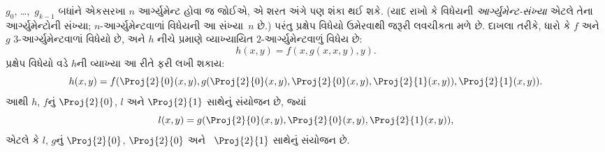 \documentclass[../../../include/open-logic-section]{subfiles}
\begin{document}
$g_0$, \dots,~$g_{k-1}$ બધાંને એકસરખા $n$ આર્ગ્યુમેન્ટ હોવા
જ જોઈએ, એ શરત અંગે પણ શંકા થઈ શકે. (યાદ રાખો કે વિધેયની
\emph{આર્ગ્યુમેન્ટ-સંખ્યા} એટલે તેના આર્ગ્યુમેન્ટોની સંખ્યા;
$n$-આર્ગ્યુમેન્ટવાળાં વિધેયની આ સંખ્યા~$n$ છે.) પરંતુ પ્રક્ષેપ
વિધેયો ઉમેરવાથી જરૂરી લવચીકતા મળે છે. દાખલા તરીકે, ધારો કે $f$
અને~$g$ $3$-આર્ગ્યુમેન્ટવાળાં વિધેયો છે, અને $h$ નીચે પ્રમાણે
વ્યાખ્યાયિત $2$-આર્ગ્યુમેન્ટવાળું વિધેય છે:
\[
h(x,y) = f(x,g(x,x,y),y).
\]
પ્રક્ષેપ વિધેયો વડે $h$ની વ્યાખ્યા આ રીતે ફરી લખી શકાય:
\[
h(x,y) = f(\Proj{2}{0}(x,y), g(\Proj{2}{0}(x,y), \Proj{2}{0}(x,y),
\Proj{2}{1}(x,y)), \Proj{2}{1}(x,y)).
\]
આથી $h$, $f$નું $\Proj{2}{0}$, $l$ અને $\Proj{2}{1}$ સાથેનું
સંયોજન છે, જ્યાં
\[
l(x,y) = g(\Proj{2}{0}(x,y),\Proj{2}{0}(x,y),\Proj{2}{1}(x,y)),
\]
એટલે કે $l$, $g$નું $\Proj{2}{0}$, $\Proj{2}{0}$ અને
~$\Proj{2}{1}$ સાથેનું સંયોજન છે.
\end{document}
